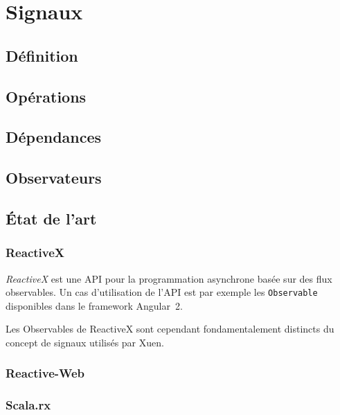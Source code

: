 \chapter{Signaux}

\section{Définition}
\section{Opérations}
\section{Dépendances}
\section{Observateurs}
\section{État de l'art}
\subsection{ReactiveX}

\emph{ReactiveX} est une API pour la programmation asynchrone basée sur des flux observables. Un cas d'utilisation de l'API est par exemple les \texttt{Observable} disponibles dans le framework Angular~2.

Les Observables de ReactiveX sont cependant fondamentalement distincts du concept de signaux utilisés par Xuen.

\subsection{Reactive-Web}
\subsection{Scala.rx}